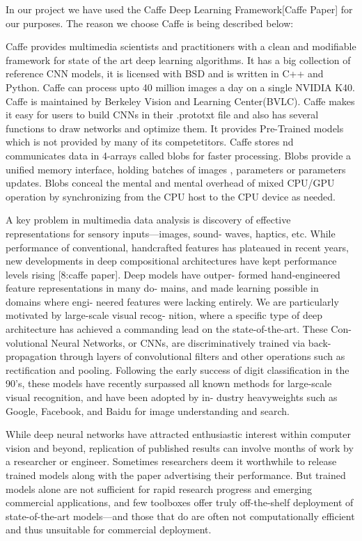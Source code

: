 In our project we have used the Caffe Deep Learning Framework[Caffe Paper] for our purposes. The reason we choose Caffe is being described below:

Caffe provides multimedia scientists and practitioners with a clean and modifiable framework for state of the art deep learning algorithms. It has a big collection of reference CNN models, it is licensed with BSD and is written in C++ and Python. Caffe can process upto 40 million images a day on a single NVIDIA K40. Caffe is maintained by Berkeley Vision and Learning Center(BVLC). Caffe makes it easy for users to build CNNs in their .prototxt file and also has several functions to draw networks and optimize them. It provides Pre-Trained models which is not provided by many of its competetitors. Caffe stores nd communicates data in 4-arrays called blobs for faster processing. Blobs provide a unified memory interface, holding batches of images , parameters or parameters updates. Blobs conceal the mental and mental overhead of mixed CPU/GPU operation by synchronizing from the CPU host to the CPU device as needed. 

A key problem in multimedia data analysis is discovery of effective representations for sensory inputs—images, sound- waves, haptics, etc. While performance of conventional, handcrafted features has plateaued in recent years, new developments in deep compositional architectures have kept performance levels rising [8:caffe paper]. Deep models have outper- formed hand-engineered feature representations in many do- mains, and made learning possible in domains where engi- neered features were lacking entirely.
We are particularly motivated by large-scale visual recog- nition, where a specific type of deep architecture has achieved a commanding lead on the state-of-the-art. These Con- volutional Neural Networks, or CNNs, are discriminatively trained via back-propagation through layers of convolutional filters and other operations such as rectification and pooling. Following the early success of digit classification in the 90’s, these models have recently surpassed all known methods for large-scale visual recognition, and have been adopted by in- dustry heavyweights such as Google, Facebook, and Baidu for image understanding and search.

While deep neural networks have attracted enthusiastic interest within computer vision and beyond, replication of published results can involve months of work by a researcher or engineer. Sometimes researchers deem it worthwhile to release trained models along with the paper advertising their performance. But trained models alone are not sufficient for rapid research progress and emerging commercial applications, and few toolboxes offer truly off-the-shelf deployment of state-of-the-art models—and those that do are often not computationally efficient and thus unsuitable for commercial deployment.

